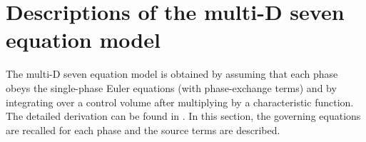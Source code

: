 \section{Descriptions of the multi-D seven equation model}\label{sec:multi-seven-equ-model}

The multi-D seven equation model is obtained by assuming that each phase obeys the single-phase Euler equations (with phase-exchange terms) and by integrating over a control volume after multiplying by a characteristic function. The detailed derivation can be found in \cite{SEM}. In this section, the governing equations are recalled for each phase and the source terms are described. 
